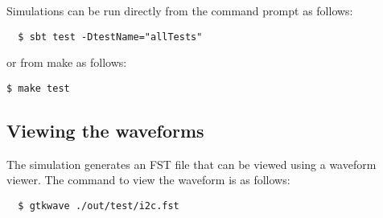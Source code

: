 Simulations can be run directly from the command prompt as follows:

\begin{verbatim}
  $ sbt test -DtestName="allTests"
\end{verbatim}

or from make as follows:

\texttt{\$ make test}

\subsection{Viewing the waveforms}

The simulation generates an FST file that can be viewed using a waveform viewer. The command to view the waveform is as follows:
\begin{verbatim}
  $ gtkwave ./out/test/i2c.fst
\end{verbatim}
